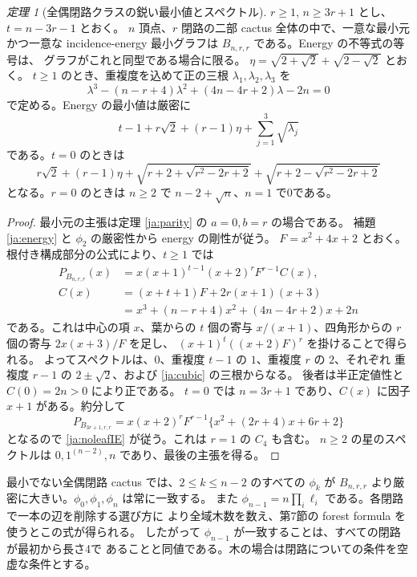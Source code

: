\documentclass[12pt]{amsart}
\theoremstyle{definition}
\theoremstyle{remark}
\numberwithin{equation}{section}
\newtheorem{jthm}[thm]{定理}
\begin{document}
\begin{jthm}[全偶閉路クラスの鋭い最小値とスペクトル]\label{ja:evenenergy}
$r\ge1$, $n\ge3r+1$ とし、$t=n-3r-1$ とおく。
$n$ 頂点、$r$ 閉路の二部 cactus 全体の中で、一意な最小元かつ一意な
incidence-energy 最小グラフは $B_{n,r,r}$ である。Energy の不等式の等号は、
グラフがこれと同型である場合に限る。
$\eta=\sqrt{2+\sqrt2}+\sqrt{2-\sqrt2}$ とおく。
$t\ge1$ のとき、重複度を込めて正の三根 $\lambda_1,\lambda_2,\lambda_3$ を
\begin{equation}\label{ja:cubic}
 \lambda^3-(n-r+4)\lambda^2+(4n-4r+2)\lambda-2n=0
\end{equation}
で定める。Energy の最小値は厳密に
\begin{equation}\label{ja:evenIE}
 t-1+r\sqrt2+(r-1)\eta+\sum_{j=1}^3\sqrt{\lambda_j}
\end{equation}
である。$t=0$ のときは
\begin{equation}\label{ja:noleafIE}
 r\sqrt2+(r-1)\eta+
 \sqrt{r+2+\sqrt{r^2-2r+2}}+
 \sqrt{r+2-\sqrt{r^2-2r+2}}
\end{equation}
となる。$r=0$ のときは $n\ge2$ で $n-2+\sqrt n$、$n=1$ で0である。
\end{jthm}
\begin{proof}
最小元の主張は定理 \ref{ja:parity} の $a=0,b=r$ の場合である。
補題 \ref{ja:energy} と $\phi_2$ の厳密性から energy の剛性が従う。
$F=x^2+4x+2$ とおく。根付き構成部分の公式により、$t\ge1$ では
\begin{align}
 P_{B_{n,r,r}}(x)
 &=x(x+1)^{t-1}(x+2)^rF^{r-1}C(x),\label{ja:factor}\\
 C(x)&=(x+t+1)F+2r(x+1)(x+3)\nonumber\\
 &=x^3+(n-r+4)x^2+(4n-4r+2)x+2n\nonumber
\end{align}
である。これは中心の項 $x$、葉からの $t$ 個の寄与 $x/(x+1)$、四角形からの
$r$ 個の寄与 $2x(x+3)/F$ を足し、
$(x+1)^t((x+2)F)^r$ を掛けることで得られる。
よってスペクトルは、$0$、重複度 $t-1$ の $1$、重複度 $r$ の $2$、それぞれ
重複度 $r-1$ の $2\pm\sqrt2$、および \eqref{ja:cubic} の三根からなる。
後者は半正定値性と $C(0)=2n>0$ により正である。
$t=0$ では $n=3r+1$ であり、$C(x)$ に因子 $x+1$ がある。約分して
\[
 P_{B_{3r+1,r,r}}
 =x(x+2)^rF^{r-1}\{x^2+(2r+4)x+6r+2\}
\]
となるので \eqref{ja:noleafIE} が従う。これは $r=1$ の $C_4$ も含む。
$n\ge2$ の星のスペクトルは $0,1^{(n-2)},n$ であり、最後の主張を得る。
\end{proof}

最小でない全偶閉路 cactus では、$2\le k\le n-2$ のすべての $\phi_k$ が
$B_{n,r,r}$ より厳密に大きい。$\phi_0,\phi_1,\phi_n$ は常に一致する。
また $\phi_{n-1}=n\prod_i\ell_i$ である。各閉路で一本の辺を削除する選び方に
より全域木数を数え、第7節の forest formula を使うとこの式が得られる。
したがって $\phi_{n-1}$ が一致することは、すべての閉路が最初から長さ4で
あることと同値である。木の場合は閉路についての条件を空虚な条件とする。
\end{document}
